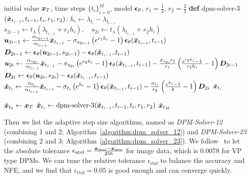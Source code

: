 \begin{algorithm}[htbp]
    \centering
    \caption{DPM-Solver-3.}\label{alg:dpm-solver-3-appendix}
    \begin{algorithmic}[1]
    \Require initial value $\bm{x}_T$, time steps $\{t_i\}_{i=0}^M$, model $\bm{\epsilon}_\theta$, $r_1=\frac{1}{3}$, $r_2=\frac{2}{3}$
    \State \textbf{def} dpm-solver-3$(\tilde{\bm{x}}_{t_{i-1}}, t_{i-1}, t_i, r_1, r_2)$:
        \State\quad $h_i \gets \lambda_{t_{i}} - \lambda_{t_{i-1}}$
    \State
        \quad $s_{2i-1} \gets t_\lambda\left(\lambda_{t_{i-1}} + r_1 h_i\right),\quad s_{2i} \gets t_\lambda\left(\lambda_{t_{i-1}} + r_2 h_i\right)$ 
    \State 
        \quad $\bm{u}_{2i-1} \gets \frac{\alpha_{s_{2i-1}}}{\alpha_{t_{i-1}}} \tilde{\bm{x}}_{t_{i-1}} - \sigma_{s_{2i-1}}\left(e^{r_1 h_i} - 1\right)\bm{\epsilon}_\theta(\tilde {\bm{x}}_{t_{i-1}},t_{i-1})$
    \State 
        \quad$\bm{D}_{2i-1} \gets \bm{\epsilon}_\theta(\bm{u}_{2i-1},s_{2i-1}) - \bm{\epsilon}_\theta(\tilde{\bm{x}}_{t_{i-1}},t_{i-1})$
    \State
        \quad$\bm{u}_{2i} \gets \frac{\alpha_{s_{2i}}}{\alpha_{t_{i-1}}} \tilde{\bm{x}}_{t_{i-1}} 
        - \sigma_{s_{2i}}\left(e^{r_2 h_i} - 1\right)\bm{\epsilon}_\theta(\tilde{\bm{x}}_{t_{i-1}},t_{i-1}) - \frac{\sigma_{s_{2i}}r_2}{r_1}\left( \frac{e^{r_2 h_i} - 1}{r_2 h_i} - 1\right)\bm{D}_{2i-1}$
    \State 
        \quad$\bm{D}_{2i} \gets \bm{\epsilon}_\theta(\bm{u}_{2i},s_{2i}) - \bm{\epsilon}_\theta(\tilde{\bm{x}}_{t_{i-1}},t_{i-1})$
    \State
        \quad$\tilde{\bm{x}}_{t_{i}} \gets \frac{\alpha_{t_{i}}}{\alpha_{t_{i-1}}} \tilde{\bm{x}}_{t_{i-1}}
            - \sigma_{t_{i}}\left(e^{h_i} - 1\right)\bm{\epsilon}_\theta(\tilde{\bm{x}}_{t_{i-1}},t_{i-1}) - \frac{\sigma_{t_{i}}}{r_2}\left( \frac{e^{h_i} - 1}{h} - 1\right)\bm{D}_{2i}$
    \State\quad \Return $\tilde{\bm{x}}_{t_{i}}$
    
    \State $\tilde{\bm{x}}_{t_0}\gets\bm{x}_T$
        \State $\tilde{\bm{x}}_{t_i} \gets \text{dpm-solver-3}(\tilde{\bm{x}}_{t_{i-1}}, t_{i-1}, t_i, r_1, r_2)$
        \EndFor
        \State  \Return $\tilde{\bm{x}}_{t_M}$
    \end{algorithmic}
\end{algorithm}

Then we list the adaptive step size algorithms, named as \textit{DPM-Solver-12} (combining 1 and 2; Algorithm~\ref{algorithm:dpm_solver_12}) and \textit{DPM-Solver-23} (combining 2 and 3; Algorithm~\ref{algorithm:dpm_solver_23}). We follow~\citep{jolicoeur2021gotta} to let the absolute tolerance $\epsilon_{\text{atol}}=\frac{\bm{x}_{\text{max}} - \bm{x}_{\text{min}}}{256}$ for image data, which is $0.0078$ for VP type DPMs. We can tune the relative tolerance $\epsilon_{\text{rtol}}$ to balance the accuracy and NFE, and we find that $\epsilon_{\text{rtol}}=0.05$ is good enough and can converge quickly.

